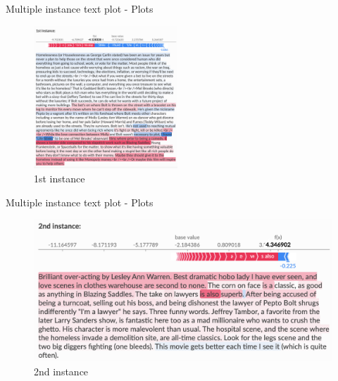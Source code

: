 \documentclass[aspectratio=169]{beamer}
\begin{document}
\begin{frame}{Multiple instance text plot - Plots}
    \begin{figure}[htbp]
        \centering
        \includegraphics[width=0.48\textwidth]{figs/shap/plots/text/sample_text_1st.png}
        \caption{1st instance}
        \label{fig:1st-sample-text}
    \end{figure}
\end{frame}

\begin{frame}{Multiple instance text plot - Plots}
    \begin{figure}[htbp]
        \centering
        \includegraphics[width=1\textwidth]{figs/shap/plots/text/sample_text_2nd.png}
        \caption{2nd instance}
        \label{fig:2nd-sample-text}
    \end{figure}
\end{frame}
\end{document}
